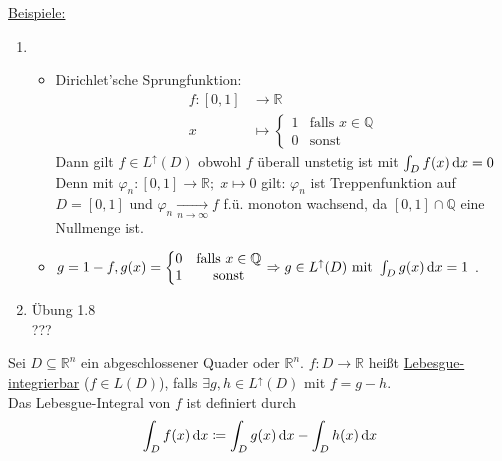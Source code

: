 \underline{Beispiele:}
\begin{enumerate}
	\item \begin{itemize}
		\item Dirichlet'sche Sprungfunktion:
	\begin{align*}
		f\colon [0,1] &\to \mathbb{R}\\
		x&\mapsto \left\{\begin{matrix}
			1 & \text{falls } x \in\mathbb{Q}\\
			0 & \text{sonst}
		\end{matrix}\right.
	\end{align*}
	Dann gilt $f\in L^\uparrow(D)$ obwohl $f$ überall unstetig ist mit $\int_{D} f(x) \,\text{d}x=0$\\
	Denn mit $\varphi_n\colon [0, 1]\to \mathbb{R};\;x\mapsto 0$ gilt: $\varphi_n$ ist Treppenfunktion auf $D=[0,1]$ und $\varphi_n\xrightarrow[n\to\infty]{}f$ f.ü. monoton wachsend, da $[0,1]\cap\mathbb{Q}$ eine Nullmenge ist.

	\item $g=1-f, g(x)=\left\{\begin{matrix}
		0 & \text{falls }  x \in\mathbb{Q}\\
		1 & \text{sonst}
	\end{matrix}\right.\Rightarrow g\in L^\uparrow(D)\ \text{mit}\ \integ{D}{g(x)}=1$ .
	\end{itemize}
	\item Übung 1.8\\
	???
\end{enumerate}

\begin{definition}
	Sei $D\subseteq\mathbb{R}^n$ ein abgeschlossener Quader oder $\mathbb{R}^n$. $f\colon D\to\mathbb{R}$ heißt \underline{Lebesgue-integrierbar} ($f\in L(D)$), falls $\exists g,h\in L^\uparrow(D)$ mit $f=g-h$.\\
	Das Lebesgue-Integral von $f$ ist definiert durch
	\[
		\int_{D} f(x) \,\text{d}x\coloneqq\int_{D} g(x) \,\text{d}x-\int_{D} h(x) \,\text{d}x	
	\]
\end{definition}


